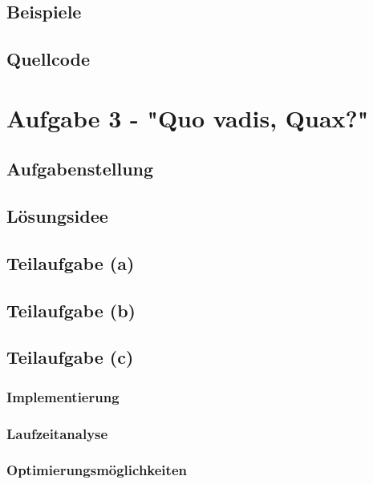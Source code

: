 \documentclass[a4paper,12pt]{article}			%
\begin{document}
\subsection{Beispiele}

\subsection{Quellcode}


\newpage
\section{Aufgabe 3 - "Quo vadis, Quax?"}



\subsection{Aufgabenstellung}

\subsection{Lösungsidee}

\subsection{Teilaufgabe (a)}

\subsection{Teilaufgabe (b)}

\subsection{Teilaufgabe (c)}
\subsubsection{Implementierung}
\subsubsection{Laufzeitanalyse}
\subsubsection{Optimierungsmöglichkeiten}
\end{document}
